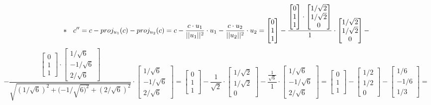 \documentclass[fleqn]{article}
\newcommand{\skata}{\hspace{0.321cm}}
\begin{document}
\[
* \skata
c'' = c - proj_{u_1}(c) - proj_{u_2}(c) =
c - \frac{c \cdot u_1}{||u_1||^2} \cdot u_1 - \frac{c \cdot u_2}{||u_2||^2} \cdot u_2 =
\begin{bmatrix} 0\\1\\1 \end{bmatrix} - \frac{\begin{bmatrix} 0\\1\\1 \end{bmatrix} \cdot \begin{bmatrix} 1/\sqrt{2}\\1/\sqrt{2}\\0 \end{bmatrix}}{1} \cdot \begin{bmatrix} 1/\sqrt{2}\\1/\sqrt{2}\\0 \end{bmatrix}
-  
\]
\[
- \frac{\begin{bmatrix} 0\\1\\1 \end{bmatrix} \cdot \begin{bmatrix} 1/\sqrt{6}\\-1/\sqrt{6}\\2/\sqrt{6} \end{bmatrix}}{\sqrt{(1/\sqrt{6})^2+(-1/\sqrt{6)^2}+(2/\sqrt{6})^2}} \cdot \begin{bmatrix} 1/\sqrt{6}\\-1/\sqrt{6}\\2/\sqrt{6} \end{bmatrix}
= 
\begin{bmatrix} 0\\1\\1 \end{bmatrix}
- \frac{1}{\sqrt{2}} \cdot \begin{bmatrix} 1/\sqrt{2}\\1/\sqrt{2}\\0 \end{bmatrix} - \frac{\frac{1}{\sqrt{6}}}{1} \cdot \begin{bmatrix} 1/\sqrt{6}\\-1/\sqrt{6}\\2/\sqrt{6} \end{bmatrix}
=
\begin{bmatrix} 0\\1\\1 \end{bmatrix} - 
\begin{bmatrix} 1/2\\1/2\\0 \end{bmatrix} -
\begin{bmatrix} 1/6\\-1/6\\1/3 \end{bmatrix}
=
\]
\end{document}

